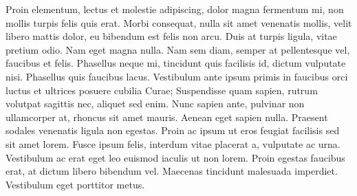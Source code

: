 Proin elementum, lectus et molestie adipiscing, dolor magna fermentum mi, non 
mollis turpis felis quis erat. Morbi consequat, nulla sit amet venenatis mollis, 
velit libero mattis dolor, eu bibendum est felis non arcu. Duis at turpis ligula, 
vitae pretium odio. Nam eget magna nulla. Nam sem diam, semper at pellentesque 
vel, faucibus et felis. Phasellus neque mi, tincidunt quis facilisis id, dictum 
vulputate nisi. Phasellus quis faucibus lacus. Vestibulum ante ipsum primis in 
faucibus orci luctus et ultrices posuere cubilia Curae; Suspendisse quam sapien, 
rutrum volutpat sagittis nec, aliquet sed enim. Nunc sapien ante, pulvinar non 
ullamcorper at, rhoncus sit amet mauris. Aenean eget sapien nulla. Praesent 
sodales venenatis ligula non egestas. Proin ac ipsum ut eros feugiat facilisis sed 
sit amet lorem. Fusce ipsum felis, interdum vitae placerat a, vulputate ac urna. 
Vestibulum ac erat eget leo euismod iaculis ut non lorem. Proin egestas faucibus 
erat, at dictum libero bibendum vel. Maecenas tincidunt malesuada imperdiet. 
Vestibulum eget porttitor metus.
%
